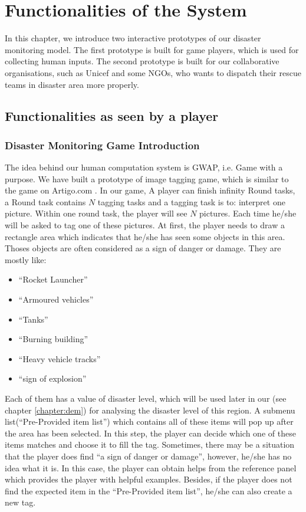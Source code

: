 \section{Functionalities of the System}

In this chapter,
we introduce two interactive prototypes of our disaster monitoring model.
The first prototype is built for game players,
which is used for collecting human inputs.
The second prototype is built for our collaborative organisations,
such as Unicef and some NGOs,
who wants to dispatch their rescue teams in disaster area more properly. 

\subsection{Functionalities as seen by a player}
\subsubsection{Disaster Monitoring Game Introduction}
The idea behind our human computation system is GWAP,
i.e. Game with a purpose.
We have built a prototype of image tagging game,
which is similar to the game on Artigo.com \cite{wieser2013artigo}.
In our game,
A player can finish infinity Round tasks, 
a Round task contains $N$ tagging tasks and a tagging task is to:
interpret one picture.
Within one round task, the player will see $N$ pictures.
Each time he/she will be asked to tag one of these pictures.
At first,
the player needs to draw a rectangle area which indicates that he/she has seen some objects in this area.
Thoses objects are often considered as a sign of danger or damage.
They are mostly like:

\begin{itemize}
  \item ``Rocket Launcher''
  \item ``Armoured vehicles''
  \item ``Tanks''
  \item ``Burning building''
  \item ``Heavy vehicle tracks''
  \item ``sign of explosion''
\end{itemize}

Each of them has a value of disaster level, 
which will be used later in our (see chapter \ref{chapter:dem}) for analysing the disaster level of this region.
A submenu list(``Pre-Provided item list'') which contains all of these items will pop up after the area has been selected.
In this step,
the player can decide which one of these items matches and choose it to fill the tag.
Sometimes,
there may be a situation that the player does find ``a sign of danger or damage'',
however, he/she has no idea what it is.
In this case, 
the player can obtain helps from the reference panel which provides the player with helpful examples.
Besides, 
if the player does not find the expected item in the ``Pre-Provided item list'',
he/she can also create a new tag.

